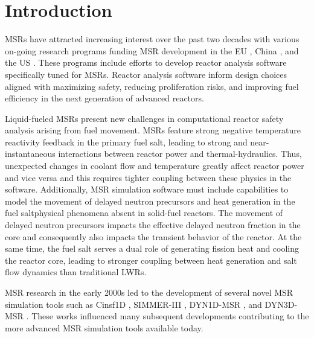 \section{Introduction} \label{sec:intro}

\glspl{MSR} have attracted increasing interest over the past two
decades with various on-going research programs funding \gls{MSR} development
in the EU \cite{cordis_severe_nodate}, China \cite{dai_17_2017}, and the US
\cite{doe_office_2021}. These programs include efforts to develop
reactor analysis software specifically tuned for \glspl{MSR}. Reactor
analysis software inform design choices aligned with
maximizing safety, reducing proliferation risks, and improving fuel
efficiency in the next generation of advanced reactors.

Liquid-fueled \glspl{MSR} present new challenges in computational reactor
safety analysis arising from fuel movement. \glspl{MSR} feature strong
negative temperature reactivity feedback in the primary fuel salt, leading to
strong and near-instantaneous
interactions between reactor power and thermal-hydraulics. Thus,
unexpected changes in coolant flow and temperature greatly affect reactor
power and vice versa and this requires tighter coupling between these physics
in the software. Additionally, \gls{MSR} simulation software must include
capabilities to model the movement of delayed neutron precursors
and heat generation in the fuel salt\textemdash physical phenomena
absent in solid-fuel reactors. The movement of delayed neutron precursors
impacts the effective delayed neutron fraction in the core and consequently
also impacts the transient behavior of the reactor. At the same time, the fuel
salt serves a dual role of generating fission heat and cooling the reactor
core, leading to stronger coupling between heat generation and salt flow
dynamics than traditional \glspl{LWR}.

\gls{MSR} research in the early 2000s led to the development of several novel
\gls{MSR} simulation tools such as Cinsf1D \cite{lecarpentier_neutronic_2003},
SIMMER-III \cite{rineiski_kinetics_2005}, DYN1D-MSR
\cite{krepel_dyn1d-msr_2005}, and DYN3D-MSR \cite{krepel_dyn3d-msr_2007}. These
works influenced many subsequent developments contributing to the more advanced
\gls{MSR} simulation tools available today.

